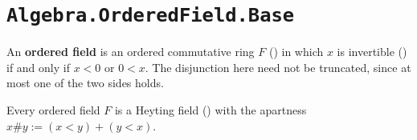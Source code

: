\section{\texttt{Algebra.OrderedField.Base}}

\begin{definition}
  \label{IsOrderedField}
  An \textbf{ordered field} is an ordered commutative ring $F$ () in which $x$ is invertible () if and only if $x < 0$ or $0 < x$. The disjunction here need not be truncated, since at most one of the two sides holds.
\end{definition}

\begin{theorem}
  \label{OrderedFieldToHeytingField}
  Every ordered field $F$ is a Heyting field () with the apartness $x \# y := (x < y) + (y < x)$.
\end{theorem}
